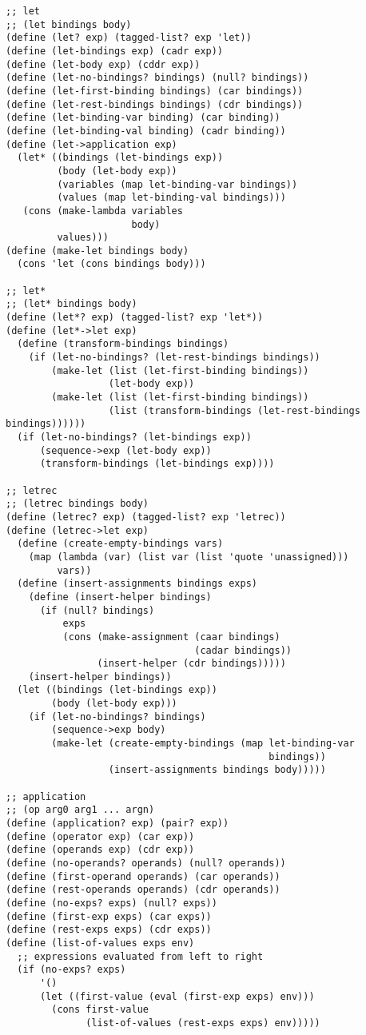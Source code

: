 \documentclass[../main.tex]{subfiles}
\begin{document}
\begin{lstlisting}
;; let
;; (let bindings body)
(define (let? exp) (tagged-list? exp 'let))
(define (let-bindings exp) (cadr exp))
(define (let-body exp) (cddr exp))
(define (let-no-bindings? bindings) (null? bindings))
(define (let-first-binding bindings) (car bindings))
(define (let-rest-bindings bindings) (cdr bindings))
(define (let-binding-var binding) (car binding))
(define (let-binding-val binding) (cadr binding))
(define (let->application exp)
  (let* ((bindings (let-bindings exp))
         (body (let-body exp))
         (variables (map let-binding-var bindings))
         (values (map let-binding-val bindings)))
   (cons (make-lambda variables
                      body)
         values)))
(define (make-let bindings body)
  (cons 'let (cons bindings body)))

;; let*
;; (let* bindings body)
(define (let*? exp) (tagged-list? exp 'let*))
(define (let*->let exp)
  (define (transform-bindings bindings)
    (if (let-no-bindings? (let-rest-bindings bindings))
        (make-let (list (let-first-binding bindings))
                  (let-body exp))
        (make-let (list (let-first-binding bindings))
                  (list (transform-bindings (let-rest-bindings bindings))))))
  (if (let-no-bindings? (let-bindings exp))
      (sequence->exp (let-body exp))
      (transform-bindings (let-bindings exp))))

;; letrec
;; (letrec bindings body)
(define (letrec? exp) (tagged-list? exp 'letrec))
(define (letrec->let exp)
  (define (create-empty-bindings vars)
    (map (lambda (var) (list var (list 'quote 'unassigned)))
         vars))
  (define (insert-assignments bindings exps)
    (define (insert-helper bindings)
      (if (null? bindings)
          exps
          (cons (make-assignment (caar bindings)
                                 (cadar bindings))
                (insert-helper (cdr bindings)))))
    (insert-helper bindings))
  (let ((bindings (let-bindings exp))
        (body (let-body exp)))
    (if (let-no-bindings? bindings)
        (sequence->exp body)
        (make-let (create-empty-bindings (map let-binding-var
                                              bindings))
                  (insert-assignments bindings body)))))

;; application
;; (op arg0 arg1 ... argn)
(define (application? exp) (pair? exp))
(define (operator exp) (car exp))
(define (operands exp) (cdr exp))
(define (no-operands? operands) (null? operands))
(define (first-operand operands) (car operands))
(define (rest-operands operands) (cdr operands))
(define (no-exps? exps) (null? exps))
(define (first-exp exps) (car exps))
(define (rest-exps exps) (cdr exps))
(define (list-of-values exps env)
  ;; expressions evaluated from left to right
  (if (no-exps? exps)
      '()
      (let ((first-value (eval (first-exp exps) env)))
        (cons first-value
              (list-of-values (rest-exps exps) env)))))


\end{lstlisting}
\end{document}

